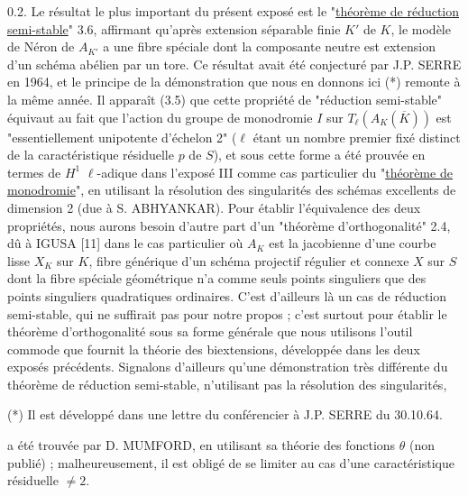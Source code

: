 0.2.  Le résultat le plus important du présent exposé est le "\underline{théorème de réduction semi-stable}" 3.6, affirmant qu'après extension séparable finie $K'$ de $K$, le modèle de Néron de $A_{K'}$ a une fibre spéciale dont la composante neutre est extension d'un schéma abélien par un tore. Ce résultat avait été conjecturé par J.P. SERRE en 1964, et le principe de la démonstration que nous en donnons ici (*) remonte à la même année. Il apparaît (3.5) que cette propriété de "réduction semi-stable" équivaut au fait que l'action du groupe de monodromie $I$ sur $T_\ell(A_K(\overline{K}))$ est "essentiellement unipotente d'échelon 2" ($\ell$ étant un nombre premier fixé distinct de la caractéristique résiduelle $p$ de $S$), et sous cette forme a été prouvée en termes de $H^1$ $\ell$-adique dans l'exposé III comme cas particulier du "\underline{théorème de monodromie}", en utilisant la résolution des singularités des schémas excellents de dimension 2 (due à S. ABHYANKAR). Pour établir l'équivalence des deux propriétés, nous aurons besoin d'autre part d'un "théorème d'orthogonalité" 2.4, dû à IGUSA [11] dans le cas particulier où $A_K$ est la jacobienne d'une courbe lisse $X_K$ sur $K$, fibre générique d'un schéma projectif régulier et connexe $X$ sur $S$ dont la fibre spéciale géométrique n'a comme seuls points singuliers que des points singuliers quadratiques ordinaires. C'est d'ailleurs là un cas de réduction semi-stable, qui ne suffirait pas pour notre propos ; c'est surtout pour établir le théorème d'orthogonalité sous sa forme générale que nous utilisons l'outil commode que fournit la théorie des biextensions, développée dans les deux exposés précédents. Signalons d'ailleurs qu'une démonstration très différente du théorème de réduction semi-stable, n'utilisant pas la résolution des singularités,

(*) Il est développé dans une lettre du conférencier à J.P. SERRE du 30.10.64.



a été trouvée par D. MUMFORD, en utilisant sa théorie des fonctions $\theta$ (non publié) ; malheureusement, il est obligé de se limiter au cas d'une caractéristique résiduelle $\neq 2$.

